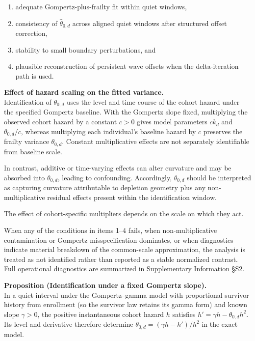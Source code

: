 \documentclass[
]{article}
\providecommand{\tightlist}{%
  \setlength{\itemsep}{0pt}\setlength{\parskip}{0pt}}
\renewenvironment{quote}{\begin{mdframed}[style=kcorquote]}{\end{mdframed}}
\begin{document}
\begin{enumerate}
\def\labelenumi{\arabic{enumi}.}
\tightlist
\item
  adequate Gompertz-plus-frailty fit within quiet windows,
\item
  consistency of \(\hat{\theta}_{0,d}\) across aligned quiet windows after structured offset correction,
\item
  stability to small boundary perturbations, and
\item
  plausible reconstruction of persistent wave offsets when the delta-iteration path is used.
\end{enumerate}

\textbf{Effect of hazard scaling on the fitted variance.}\\
Identification of \(\theta_{0,d}\) uses the level and time course of the cohort hazard under the specified Gompertz baseline. With the Gompertz slope fixed, multiplying the observed cohort hazard by a constant \(c>0\) gives model parameters \(c k_d\) and \(\theta_{0,d}/c\), whereas multiplying each individual's baseline hazard by \(c\) preserves the frailty variance \(\theta_{0,d}\). Constant multiplicative effects are not separately identifiable from baseline scale.

In contrast, additive or time-varying effects can alter curvature and may be absorbed into \(\theta_{0,d}\), leading to confounding. Accordingly, \(\theta_{0,d}\) should be interpreted as capturing curvature attributable to depletion geometry plus any non-multiplicative residual effects present within the identification window.

The effect of cohort-specific multipliers depends on the scale on which they act.

When any of the conditions in items 1--4 fails, when non-multiplicative contamination or Gompertz misspecification dominates, or when diagnostics indicate material breakdown of the common-scale approximation, the analysis is treated as not identified rather than reported as a stable normalized contrast. Full operational diagnostics are summarized in Supplementary Information §S2.

\begin{quote}
\textbf{Proposition (Identification under a fixed Gompertz slope).}\\
In a quiet interval under the Gompertz--gamma model with proportional survivor history from enrollment (so the survivor law retains its gamma form) and known slope \(\gamma>0\), the positive instantaneous cohort hazard \(h\) satisfies \(h'=\gamma h-\theta_{0,d}h^2\). Its level and derivative therefore determine \(\theta_{0,d}=(\gamma h-h')/h^2\) in the exact model.
\end{quote}
\end{document}
